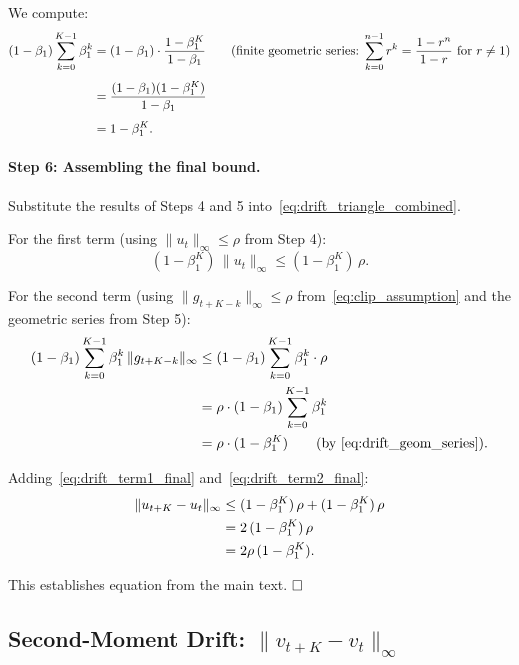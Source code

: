 \documentclass{article}
\begin{document}
We compute:
\begin{align}
(1-\beta_1)\sum_{k=0}^{K-1}\beta_1^k
&= (1-\beta_1)\cdot\frac{1 - \beta_1^K}{1 - \beta_1}
\qquad\text{(finite geometric series: $\sum_{k=0}^{n-1}r^k = \frac{1-r^n}{1-r}$ for $r \neq 1$)}
\notag \\[4pt]
&= \frac{(1-\beta_1)(1-\beta_1^K)}{1-\beta_1}
\notag \\[4pt]
&= 1 - \beta_1^K.
\label{eq:drift_geom_series}
\end{align}

\paragraph{Step 6: Assembling the final bound.}

Substitute the results of Steps 4 and 5
into~\eqref{eq:drift_triangle_combined}.

For the first term (using $\|u_t\|_\infty \leq \rho$ from Step 4):
\begin{equation}
(1-\beta_1^K)\,\|u_t\|_\infty
\leq (1-\beta_1^K)\,\rho.
\label{eq:drift_term1_final}
\end{equation}

For the second term (using $\|g_{t+K-k}\|_\infty \leq \rho$
from~\eqref{eq:clip_assumption} and the geometric series from Step 5):
\begin{align}
(1-\beta_1)\sum_{k=0}^{K-1}\beta_1^k\,\|g_{t+K-k}\|_\infty
&\leq (1-\beta_1)\sum_{k=0}^{K-1}\beta_1^k\cdot\rho
\notag \\
&= \rho\cdot(1-\beta_1)\sum_{k=0}^{K-1}\beta_1^k
\notag \\
&= \rho\cdot(1-\beta_1^K)
\qquad\text{(by~\eqref{eq:drift_geom_series})}.
\label{eq:drift_term2_final}
\end{align}

Adding~\eqref{eq:drift_term1_final} and~\eqref{eq:drift_term2_final}:
\begin{align}
\|u_{t+K} - u_t\|_\infty
&\leq (1-\beta_1^K)\,\rho + (1-\beta_1^K)\,\rho
\notag \\
&= 2\,(1-\beta_1^K)\,\rho
\notag \\
&= 2\rho\,(1-\beta_1^K).
\label{eq:drift_u_qed}
\end{align}

This establishes equation from the main text. $\hfill\square$

\subsection{Second-Moment Drift: \texorpdfstring{$\|v_{t+K}-v_t\|_\infty$}{||v(t+K)-v(t)|| infinity}}
\label{sec:drift_second}
\end{document}

